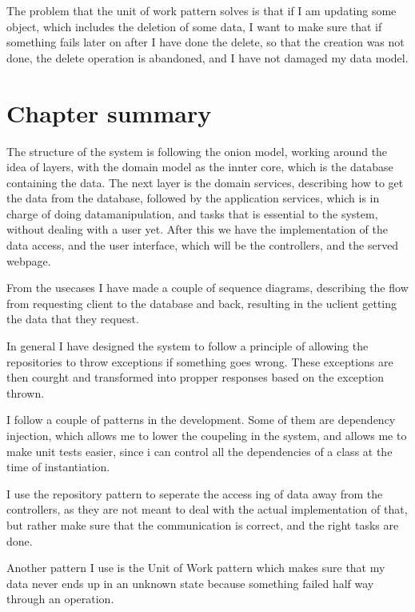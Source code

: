 The problem that the unit of work pattern solves is that if I am updating some object, which includes the deletion of some data, I want to make sure that if something fails later on after I have done the delete, so that the creation was not done, the delete operation is abandoned, and I have not damaged my data model\cite{uow}.

\section{Chapter summary}
The structure of the system is following the onion model, working around the
idea of layers, with the domain model as the innter core, which is the database
containing the data. The next layer is the domain services, describing how to
get the data from the database, followed by the application services, which is
in charge of doing datamanipulation, and tasks that is essential to the system,
without dealing with a user yet. After this we have the implementation of the
data access, and the user interface, which will be the controllers, and the
served webpage.

From the usecases I have made a couple of sequence diagrams, describing the flow
from requesting client to the database and back, resulting in the uclient
getting the data that they request. 

In general I have designed the system to follow a principle of allowing the
repositories to throw exceptions if something goes wrong. These exceptions are
then courght and transformed into propper responses based on the exception thrown.

I follow a couple of patterns in the development. Some of them are dependency
injection, which allows me to lower the coupeling in the system, and allows me
to make unit tests easier, since i can control all the dependencies of a class
at the time of instantiation.

I use the repository pattern to seperate the access ing of data away from the
controllers, as they are not meant to deal with the actual implementation of
that, but rather make sure that the communication is correct, and the right
tasks are done.

Another pattern I use is the Unit of Work pattern which makes sure that my data
never ends up in an unknown state because something failed half way through an
operation. 
